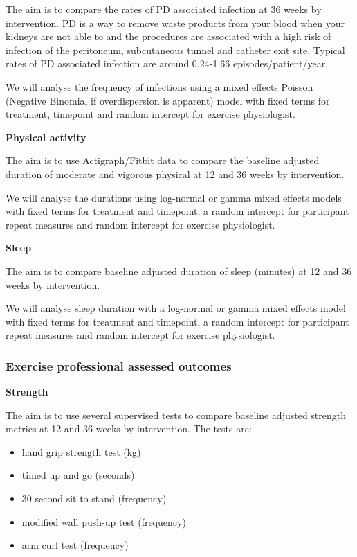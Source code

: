 \documentclass[
]{article}
\begin{document}
The aim is to compare the rates of PD associated infection at 36 weeks by intervention.
PD is a way to remove waste products from your blood when your kidneys are not able to and the procedures are associated with a high risk of infection of the peritoneum, subcutaneous tunnel and catheter exit site.
Typical rates of PD associated infection are around 0.24-1.66 episodes/patient/year.

We will analyse the frequency of infections using a mixed effects Poisson (Negative Binomial if overdispersion is apparent) model with fixed terms for treatment, timepoint and random intercept for exercise physiologist.

\textbf{Physical activity}

The aim is to use Actigraph/Fitbit data to compare the baseline adjusted duration of moderate and vigorous physical at 12 and 36 weeks by intervention.

We will analyse the durations using log-normal or gamma mixed effects models with fixed terms for treatment and timepoint, a random intercept for participant repeat measures and random intercept for exercise physiologist.

\textbf{Sleep}

The aim is to compare baseline adjusted duration of sleep (minutes) at 12 and 36 weeks by intervention.

We will analyse sleep duration with a log-normal or gamma mixed effects model with fixed terms for treatment and timepoint, a random intercept for participant repeat measures and random intercept for exercise physiologist.


\hypertarget{exercise-professional-assessed-outcomes}{%
  \subsubsection{Exercise professional assessed outcomes}\label{exercise-professional-assessed-outcomes}}



\textbf{Strength}

The aim is to use several supervised tests to compare baseline adjusted strength metrics at 12 and 36 weeks by intervention.
The tests are:

\begin{itemize}
  \item hand grip strength test (kg)
  \item timed up and go (seconds)
  \item 30 second sit to stand (frequency)
  \item modified wall push-up test (frequency)
  \item arm curl test (frequency)

\end{itemize}
\end{document}
